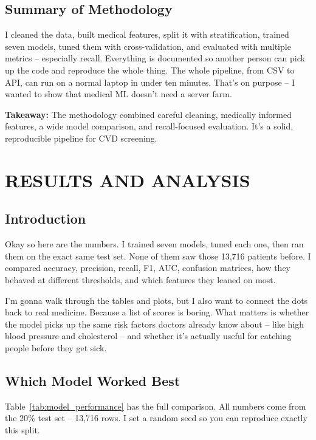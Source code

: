 \documentclass[12pt, a4paper, oneside]{book}
\begin{document}
\section{Summary of Methodology}
I cleaned the data, built medical features, split it with stratification, trained seven models, tuned them with cross-validation, and evaluated with multiple metrics – especially recall. Everything is documented so another person can pick up the code and reproduce the whole thing. The whole pipeline, from CSV to API, can run on a normal laptop in under ten minutes. That's on purpose – I wanted to show that medical ML doesn't need a server farm.

\begin{takeaway}
\textbf{Takeaway:} The methodology combined careful cleaning, medically informed features, a wide model comparison, and recall-focused evaluation. It's a solid, reproducible pipeline for CVD screening.
\end{takeaway}

\chapter{RESULTS AND ANALYSIS}

\section{Introduction}
Okay so here are the numbers. I trained seven models, tuned each one, then ran them on the exact same test set. None of them saw those 13,716 patients before. I compared accuracy, precision, recall, F1, AUC, confusion matrices, how they behaved at different thresholds, and which features they leaned on most.

I'm gonna walk through the tables and plots, but I also want to connect the dots back to real medicine. Because a list of scores is boring. What matters is whether the model picks up the same risk factors doctors already know about – like high blood pressure and cholesterol – and whether it's actually useful for catching people before they get sick.

\section{Which Model Worked Best}
Table~\ref{tab:model_performance} has the full comparison. All numbers come from the 20\% test set – 13,716 rows. I set a random seed so you can reproduce exactly this split.
\end{document}
